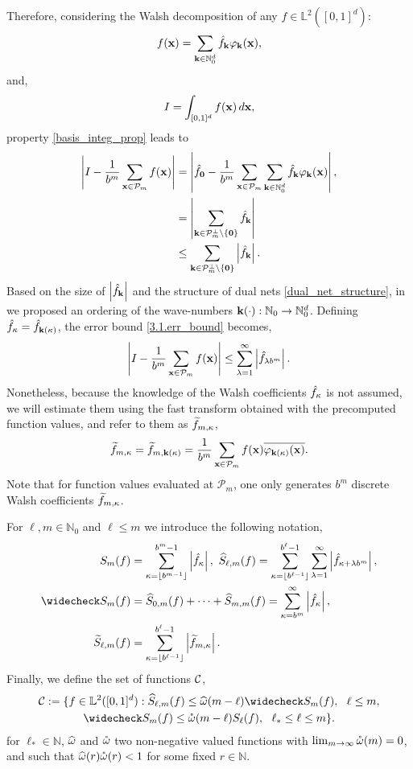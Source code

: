 Therefore, considering the Walsh decomposition of any $f\in \mathbb{L}^2([0,1]^d)$: \[
f(\boldsymbol{\mathbf{x}})=\sum_{\boldsymbol{\mathbf{k}}\in\mathbb{N}_0^d}\hat{f}_{\boldsymbol{\mathbf{k}}}\varphi_{\boldsymbol{\mathbf{k}}}(\boldsymbol{\mathbf{x}}), \]
and,
\[ I = \int_{[0,1]^d} f(\boldsymbol{\mathbf{x}})\,d\boldsymbol{\mathbf{x}},\]
property \eqref{basis_integ_prop} leads to
\begin{align}
\nonumber
\left\lvert I - \frac{1}{b^m}\sum_{\boldsymbol{\mathbf{x}}\in\mathcal{P}_m}f(\boldsymbol{\mathbf{x}})\right\rvert &=
\left\lvert\hat{f}_{\boldsymbol{\mathbf{0}}} - \frac{1}{b^m}\sum_{\boldsymbol{\mathbf{x}}\in\mathcal{P}_m}\sum_{\boldsymbol{\mathbf{k}}\in\mathbb{N}_0^d}\hat{f}_{\boldsymbol{\mathbf{k}}}\varphi_{\boldsymbol{\mathbf{k}}}(\boldsymbol{\mathbf{x}})\right\rvert, \\
\nonumber
&= \left\lvert\sum_{\boldsymbol{\mathbf{k}}\in\mathcal{P}_m^\perp\setminus\{\boldsymbol{\mathbf{0}}\}}\hat{f}_{\boldsymbol{\mathbf{k}}}\right\rvert \\
& \leq \sum_{\boldsymbol{\mathbf{k}}\in\mathcal{P}_m^\perp\setminus\{\boldsymbol{\mathbf{0}}\}}\left\lvert\hat{f}_{\boldsymbol{\mathbf{k}}}\right\rvert. \label{3.1.err_bound}
\end{align}
Based on the size of $\left\lvert\hat{f}_{\boldsymbol{\mathbf{k}}}\right\rvert$ and the structure of dual nets \eqref{dual_net_structure}, in \cite[Sec. 4.1]{HicJim} we proposed an ordering of the wave-numbers $\boldsymbol{\mathbf{k}}(\cdot):\mathbb{N}_0\rightarrow\mathbb{N}_0^d$. Defining $\hat{f}_{\kappa}=\hat{f}_{\boldsymbol{\mathbf{k}}(\kappa)}$, the error bound \eqref{3.1.err_bound} becomes,
\begin{equation}
\left\lvert I - \frac{1}{b^m}\sum_{\boldsymbol{\mathbf{x}}\in\mathcal{P}_m}f(\boldsymbol{\mathbf{x}})\right\rvert \le \sum_{\lambda=1}^{\infty} \left \lvert \hat{f}_{\lambda b^m}\right \rvert.
\end{equation}
Nonetheless, because the knowledge of the Walsh coefficients $\hat{f}_{\kappa}$ is not assumed, we will estimate them using the fast transform obtained with the precomputed function values, and refer to them as $\widetilde{f}_{m,\kappa}$,
\[
\widetilde{f}_{m,\kappa}=\widetilde{f}_{m,\boldsymbol{\mathbf{k}}(\kappa)}=\frac{1}{b^m}\sum_{\boldsymbol{\mathbf{x}}\in\mathcal{P}_m}f(\boldsymbol{\mathbf{x}})\overline{\varphi_{\boldsymbol{\mathbf{k}}(\kappa)}(\boldsymbol{\mathbf{x}})}.
\]
Note that for function values evaluated at $\mathcal{P}_m$, one only generates $b^m$ discrete Walsh coefficients $\widetilde{f}_{m,\kappa}$.

For $\ell,m \in \mathbb{N}_0$ and $\ell \le m$ we introduce the following notation,
\begin{align*}
S_m(f) &=  \sum_{\kappa=\left \lfloor b^{m-1} \right \rfloor}^{b^{m}-1} \absolute{\hf_{\kappa}}, \ 
\hS_{\ell,m}(f)  = \sum_{\kappa=\left \lfloor b^{\ell-1} \right \rfloor}^{b^{\ell}-1} \sum_{\lambda=1}^{\infty} \absolute{ \hf_{\kappa+\lambda b^{m}}}, \\
\wcS_m(f)&=\hS_{0,m}(f) + \cdots + \hS_{m,m}(f)=
\sum_{\kappa=b^{m}}^{\infty} \absolute{\hf_{\kappa}},\\ 
\tS_{\ell,m}(f) &= \sum_{\kappa=\left \lfloor b^{\ell-1}\right \rfloor}^{b^{\ell}-1} \absolute{\tf_{m,\kappa}}.
\end{align*}
Finally, we define the set of functions $\mathcal{C}$,
\begin{multline} \label{conecond}
\cc:=\{f \in \mathbb{L}^2(\cube) : \hS_{\ell,m}(f) \le \homega(m-\ell) \wcS_m(f),\ \ \ell \le m, \\
\wcS_m(f) \le \wcomega(m-\ell) S_{\ell}(f),\ \  \ell_* \le \ell \le m\}.
\end{multline}
for $\ell_* \in \mathbb{N}$, $\widehat{\omega}$ and $\mathring{\omega}$ two non-negative valued functions with $\lim_{m \to \infty} \mathring{\omega}(m) = 0$, and such that $\widehat{\omega}(r)\mathring{\omega}(r)<1$ for some fixed $r\in\mathbb{N}$.

